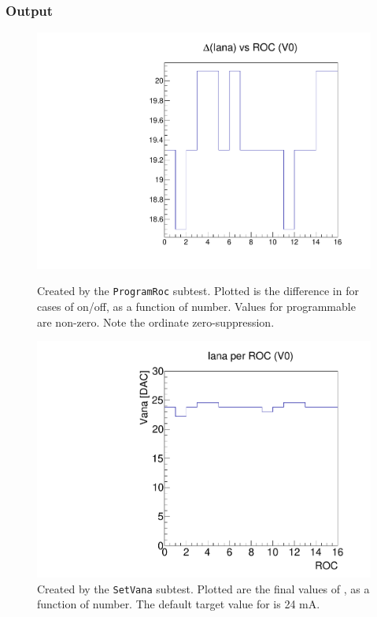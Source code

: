 \subsubsection{Output}

\begin{figure}[!htp]
\centering
\begin{minipage}{0.45\textwidth}
  \includegraphics[width=1.0\textwidth]{figures/pretest_programROC.pdf}
  \caption{Created by the {\tt ProgramRoc} subtest. 
    Plotted is the difference in \iana for cases of \vana on/off, as a function of \roc number.
    Values for programmable \rocs are non-zero. Note the
    ordinate zero-suppression.}
  \label{fig:pretest_programROC}
\end{minipage}
\hspace{0.3cm}
\begin{minipage}{0.45\textwidth}
  \includegraphics[width=1.0\textwidth]{figures/pretest_Iana.pdf}
  \caption{Created by the {\tt SetVana} subtest.  
    Plotted are the final values of \iana, as a function of \roc number.
    The default target value for \iana is 24 mA.}
  \label{fig:pretest_Iana}
\end{minipage}
\end{figure}

